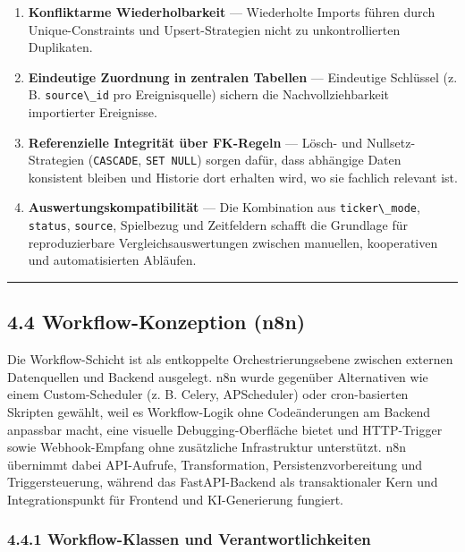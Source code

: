 \begin{enumerate}
\def\labelenumi{\arabic{enumi}.}
\tightlist
\item
  \textbf{Konfliktarme Wiederholbarkeit} --- Wiederholte Imports führen
  durch Unique-Constraints und Upsert-Strategien nicht zu
  unkontrollierten Duplikaten.
\item
  \textbf{Eindeutige Zuordnung in zentralen Tabellen} --- Eindeutige
  Schlüssel (z. B. \passthrough{\lstinline!source\_id!} pro
  Ereignisquelle) sichern die Nachvollziehbarkeit importierter
  Ereignisse.
\item
  \textbf{Referenzielle Integrität über FK-Regeln} --- Lösch- und
  Nullsetz-Strategien (\passthrough{\lstinline!CASCADE!},
  \passthrough{\lstinline!SET NULL!}) sorgen dafür, dass abhängige Daten
  konsistent bleiben und Historie dort erhalten wird, wo sie fachlich
  relevant ist.
\item
  \textbf{Auswertungskompatibilität} --- Die Kombination aus
  \passthrough{\lstinline!ticker\_mode!},
  \passthrough{\lstinline!status!}, \passthrough{\lstinline!source!},
  Spielbezug und Zeitfeldern schafft die Grundlage für reproduzierbare
  Vergleichsauswertungen zwischen manuellen, kooperativen und
  automatisierten Abläufen.
\end{enumerate}

\begin{center}\rule{0.5\linewidth}{0.5pt}\end{center}

\subsection{4.4 Workflow-Konzeption
(n8n)}\label{workflow-konzeption-n8n}

Die Workflow-Schicht ist als entkoppelte Orchestrierungsebene zwischen
externen Datenquellen und Backend ausgelegt. n8n wurde gegenüber
Alternativen wie einem Custom-Scheduler (z. B. Celery, APScheduler) oder
cron-basierten Skripten gewählt, weil es Workflow-Logik ohne
Codeänderungen am Backend anpassbar macht, eine visuelle
Debugging-Oberfläche bietet und HTTP-Trigger sowie Webhook-Empfang ohne
zusätzliche Infrastruktur unterstützt. n8n übernimmt dabei API-Aufrufe,
Transformation, Persistenzvorbereitung und Triggersteuerung, während das
FastAPI-Backend als transaktionaler Kern und Integrationspunkt für
Frontend und KI-Generierung fungiert.

\subsubsection{4.4.1 Workflow-Klassen und
Verantwortlichkeiten}\label{workflow-klassen-und-verantwortlichkeiten}

